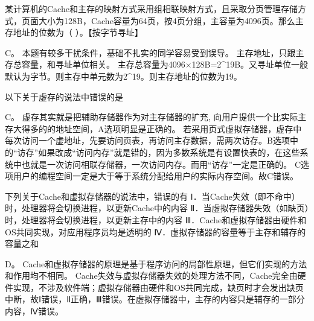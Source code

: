\question 某计算机的Cache和主存的映射方式采用组相联映射方式，且采取分页管理存储方式，页面大小为128B，Cache容量为64页，按4页分组，主容量为4096页。那么主存地址的位数为（
）。【按字节寻址】
\par{}
\begin{solution}C。 本题有较多干扰条件，基础不扎实的同学容易受到误导。
主存地址，只跟主存总容量，和寻址单位相关。
主存总容量为4096×128B=2\^{}19B。又寻址单位一般默认为字节。则主存中单元数为2\^{}19。则主存地址的位数为19。
\end{solution}
\question 以下关于虚存的说法中错误的是
\par{}
\begin{solution}C。 虚存其实就是把辅助存储器作为对主存储器的扩充,
向用户提供一个比实际主存大得多的的地址空间，A选项明显是正确的。
若采用页式虚拟存储器，虚存中每次访问一个虚地址，先要访问页表，再访问主存数据，需两次访存。B选项中的``访存''如果改成``访问内存''就是错的，因为多数系统是有设置快表的，在这些系统中也就是一次访问相联存储器，一次访问内存。而用``访存''一定是正确的。
C选项用户的编程空间一定是大于等于系统分配给用户的实际内存空间。故C错误。
\end{solution}
\question 下列关于Cache和虚拟存储器的说法中，错误的有
Ⅰ．当Cache失效（即不命中）时，处理器将会切换进程，以更新Cache中的内容
Ⅱ．当虚拟存储器失效（如缺页）时，处理器将会切换进程，以更新主存中的内容
Ⅲ．Cache和虚拟存储器由硬件和OS共同实现，对应用程序员均是透明的
Ⅳ．虚拟存储器的容量等于主存和辅存的容量之和
\par{}
\begin{solution}D。
Cache和虚拟存储器的原理是基于程序访问的局部性原理，但它们实现的方法和作用均不相同。
Cache失效与虚拟存储器失效的处理方法不同，Cache完全由硬件实现，不涉及软件端；虚拟存储器由硬件和OS共同完成，缺页时才会发出缺页中断，故Ⅰ错误，Ⅱ正确，Ⅲ错误。在虚拟存储器中，主存的内容只是辅存的一部分内容，Ⅳ错误。
\end{solution}
